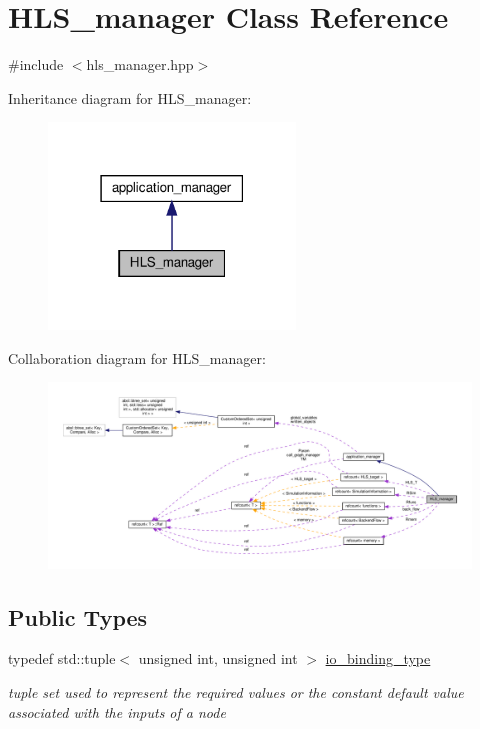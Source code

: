 \hypertarget{classHLS__manager}{}\section{H\+L\+S\+\_\+manager Class Reference}
\label{classHLS__manager}


{\ttfamily \#include $<$hls\+\_\+manager.\+hpp$>$}



Inheritance diagram for H\+L\+S\+\_\+manager\+:
\nopagebreak
\begin{figure}[H]
\begin{center}
\leavevmode
\includegraphics[width=186pt]{d8/dc3/classHLS__manager__inherit__graph}
\end{center}
\end{figure}


Collaboration diagram for H\+L\+S\+\_\+manager\+:
\nopagebreak
\begin{figure}[H]
\begin{center}
\leavevmode
\includegraphics[width=350pt]{d9/d57/classHLS__manager__coll__graph}
\end{center}
\end{figure}
\subsection*{Public Types}
\begin{DoxyCompactItemize}
\item 
typedef std\+::tuple$<$ unsigned int, unsigned int $>$ \hyperlink{classHLS__manager_a972627cc658afa992590b9d2bf1a1e87}{io\+\_\+binding\+\_\+type}
\begin{DoxyCompactList}\small\item\em tuple set used to represent the required values or the constant default value associated with the inputs of a node \end{DoxyCompactList}\end{DoxyCompactItemize}
